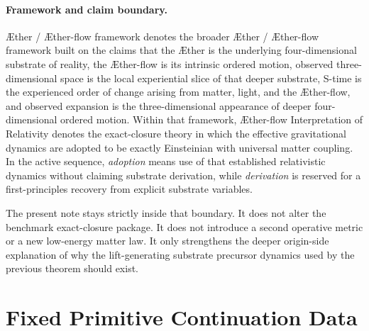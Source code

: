 \documentclass[11pt]{article}
\newcommand{\Aether}{\AE{}ther}
\newcommand{\Aflow}{\AE{}ther-flow}
\newcommand{\TheoryName}{\Aflow{} Interpretation of Relativity}
\newcommand{\TheoryProgram}{\Aether{} / \Aflow{} framework}
\begin{document}
\paragraph{Framework and claim boundary.}
\TheoryProgram{} denotes the broader \Aether{} / \Aflow{} framework built on the claims that the \Aether{} is the underlying four-dimensional substrate of reality, the \Aflow{} is its intrinsic ordered motion, observed three-dimensional space is the local experiential slice of that deeper substrate, S-time is the experienced order of change arising from matter, light, and the \Aflow{}, and observed expansion is the three-dimensional appearance of deeper four-dimensional ordered motion. Within that framework, \TheoryName{} denotes the exact-closure theory in which the effective gravitational dynamics are adopted to be exactly Einsteinian with universal matter coupling. In the active sequence, \emph{adoption} means use of that established relativistic dynamics without claiming substrate derivation, while \emph{derivation} is reserved for a first-principles recovery from explicit substrate variables.

The present note stays strictly inside that boundary. It does not alter the benchmark exact-closure package. It does not introduce a second operative metric or a new low-energy matter law. It only strengthens the deeper origin-side explanation of why the lift-generating substrate precursor dynamics used by the previous theorem should exist.

\section{Fixed Primitive Continuation Data}
\end{document}
